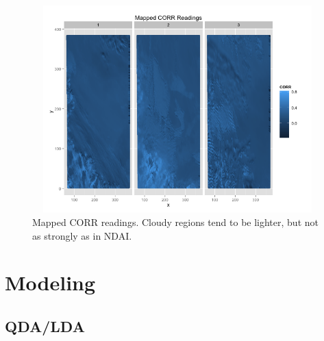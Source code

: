 \documentclass{article}\usepackage[]{graphicx}\usepackage[]{color}
\begin{document}
\begin{figure}[H]
\includegraphics[width = 18cm, height = 8cm]{CORREDA.png}
\caption{Mapped CORR readings. Cloudy regions tend to be lighter, but not as strongly as in NDAI.}
\end{figure}

\section{Modeling}

\subsection{QDA/LDA}
\end{document}
